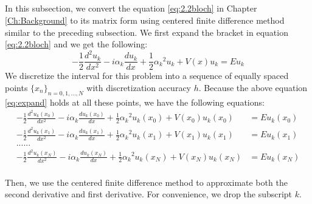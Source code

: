 \subsection{}
In this subsection, we convert the equation \ref{eq:2.2bloch} in Chapter \ref{Ch:Background} to its matrix form using centered finite difference method similar to the preceding subsection. 
We first expand the bracket in equation \ref{eq:2.2bloch} and we get the following: 
\begin{equation}\label{eq:expand}
-\frac{1}{2}\frac{d^2u_k}{dx^2}-i\alpha_k \frac{d u_k}{dx} +\frac{1}{2}{\alpha_k}^2u_k+V(x)u_k = Eu_k
\end{equation}
We discretize the interval for this problem into a sequence of equally spaced points $\{x_n\}_{n = 0,1,...,N}$ with discretization accuracy $h$. Because the above equation \ref{eq:expand} holds at all these points, we have the following equations:
\begin{align*} 
 -\frac{1}{2}\frac{d^2u_k(x_0)}{dx^2}-i\alpha_k \frac{d u_k(x_0)}{dx} +\frac{1}{2}{\alpha_k}^2u_k(x_0)+V(x_0)u_k(x_0)  &= Eu_k(x_0)  \\
  -\frac{1}{2}\frac{d^2u_k(x_1)}{dx^2}-i\alpha_k \frac{d u_k(x_1)}{dx} +\frac{1}{2}{\alpha_k}^2u_k(x_1)+V(x_1)u_k(x_1)  &= Eu_k(x_1) \\
......\\
 -\frac{1}{2}\frac{d^2u_k(x_N)}{dx^2}-i\alpha_k \frac{d u_k(x_N)}{dx} +\frac{1}{2}{\alpha_k}^2u_k(x_N)+V(x_N)u_k(x_N)  &= Eu_k(x_N) \\
\end{align*}

Then, we use the centered finite difference method to approximate both the second derivative and first derivative. For convenience, we drop the subscript $k$. 

